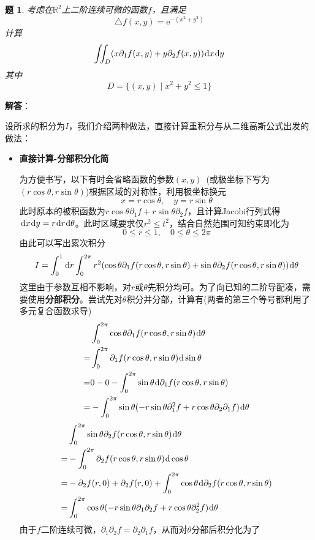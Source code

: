 \documentclass[a4paper,UTF8,fontset=windows,AutoFakeBold]{ctexart}
\newcommand*{\dr}{\hspace{0.07em}\mathrm{d}}
\newcommand*{\er}{\mathrm{e}}
\newcommand*{\rb}{\mathbb{R}}
\theoremstyle{ex}
\newtheorem{exercise}{题}
\newcommand{\sol}[1]{{\vspace{5pt}\kaishu\noindent\textbf{解答}：\vspace{-3pt}
\begin{compactitem}
    \item[] #1
\end{compactitem}
}}
\begin{document}
\begin{framed}
\begin{exercise}
    考虑在$\rb^2$上二阶连续可微的函数$f$，且满足
    $$\triangle f(x,y)=\er^{-(x^2+y^2)}$$
    计算
    $$\iint_D(x\partial_1f(x,y)+y\partial_2f(x,y))\dr x\dr y$$
    其中
    $$D=\{(x,y)\mid x^2+y^2\le1\}$$
\end{exercise}
\sol{
    设所求的积分为$I$，我们介绍两种做法，直接计算重积分与从二维高斯公式出发的做法：
    \begin{itemize}
        \item \textbf{直接计算-分部积分化简}
        
        为方便书写，以下有时会省略函数的参数$(x,y)$\ (或极坐标下写为$(r\cos\theta,r\sin\theta)$)根据区域的对称性，利用极坐标换元
        $$x=r\cos\theta,\quad y=r\sin\theta$$
        此时原本的被积函数为$r\cos\theta\partial_1f+r\sin\theta\partial_2f$，且计算Jacobi行列式得$\dr x\dr y=r\dr r\dr\theta$。此时区域要求仅$r^2\le t^2$，结合自然范围可知约束即化为
        $$0\le r\le1,\quad0\le\theta\le2\pi$$
        由此可以写出累次积分
        $$I=\int_0^1\dr r\int_0^{2\pi}r^2(\cos\theta\partial_1f(r\cos\theta,r\sin\theta)+\sin\theta\partial_2f(r\cos\theta,r\sin\theta))\dr\theta$$
        这里由于参数互相不影响，对$r$或$\theta$先积分均可。为了向已知的二阶导配凑，需要使用\textbf{分部积分}。尝试先对$\theta$积分并分部，计算有(两者的第三个等号都利用了多元复合函数求导)
        $$\begin{aligned}&\int_0^{2\pi}\cos\theta\partial_1f(r\cos\theta,r\sin\theta)\dr\theta\\=&\int_0^{2\pi}\partial_1f(r\cos\theta,r\sin\theta)\dr\sin\theta\\=&0-0-\int_0^{2\pi}\sin\theta\dr\partial_1f(r\cos\theta,r\sin\theta)\\=&-\int_0^{2\pi}\sin\theta(-r\sin\theta\partial_1^2f+r\cos\theta\partial_2\partial_1f)\dr\theta\end{aligned}$$
        $$\begin{aligned}&\int_0^{2\pi}\sin\theta\partial_2f(r\cos\theta,r\sin\theta)\dr\theta\\=&-\int_0^{2\pi}\partial_2f(r\cos\theta,r\sin\theta)\dr\cos\theta\\=&-\partial_2f(r,0)+\partial_2f(r,0)+\int_0^{2\pi}\cos\theta\dr\partial_2f(r\cos\theta,r\sin\theta)\\=&\int_0^{2\pi}\cos\theta(-r\sin\theta\partial_1\partial_2f+r\cos\theta\partial_2^2f)\dr\theta\end{aligned}$$
        由于$f$二阶连续可微，$\partial_1\partial_2f=\partial_2\partial_1f$，从而对$\theta$分部后积分化为了

\end{itemize}}
\end{framed}
\end{document}
